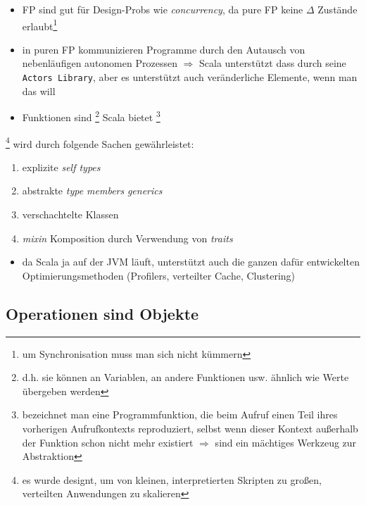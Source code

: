 \begin{itemize}
  \item FP sind gut für Design-Probs wie \textit{concurrency}, da pure FP
  keine $\Delta$ Zustände erlaubt\footnote{um Synchronisation muss man
  sich nicht kümmern}
  \item in puren FP kommunizieren Programme durch den Autausch von
  nebenläufigen autonomen Prozessen $\Rightarrow$ Scala unterstützt dass
  durch seine \texttt{Actors Library}, aber es unterstützt auch
  veränderliche Elemente, wenn man das will
  \item Funktionen sind \footnote{d.h. sie können 
  an Variablen, an andere Funktionen usw. ähnlich wie Werte übergeben werden}
  \und Scala bietet \footnote{bezeichnet man 
  eine Programmfunktion, die beim Aufruf einen Teil ihres vorherigen
  Aufrufkontexts reproduziert, selbst wenn dieser Kontext außerhalb der 
  Funktion schon nicht mehr existiert $\Rightarrow$ sind ein mächtiges 
  Werkzeug zur Abstraktion} 
\end{itemize}


\footnote{es wurde designt, um von kleinen, interpretierten
Skripten zu großen, verteilten Anwendungen zu skalieren} wird durch folgende
Sachen gewährleistet:


\begin{enumerate}
  \item explizite \textit{self types}
  \item abstrakte \textit{type members} \und \textit{generics}
  \item verschachtelte Klassen
  \item \textit{mixin} Komposition durch Verwendung von \textit{traits}
\end{enumerate}




\begin{itemize}
  \item da Scala ja auf der JVM läuft, unterstützt auch die ganzen dafür
  entwickelten Optimierungsmethoden (Profilers, verteilter Cache, Clustering)
\end{itemize}


\subsection{Operationen sind Objekte}


